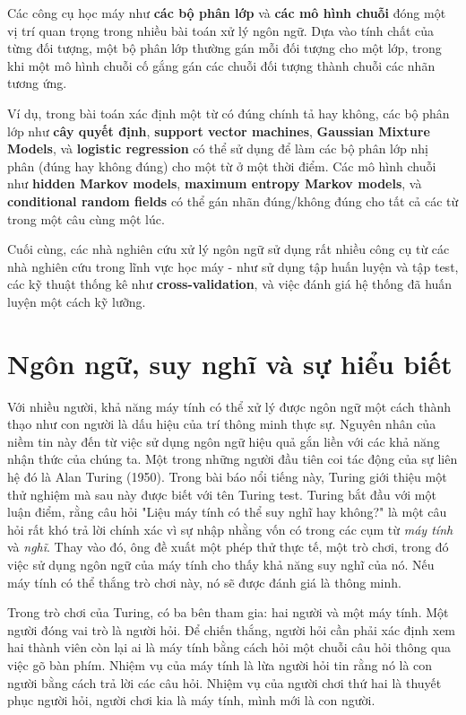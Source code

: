 Các công cụ học máy như \textbf{các bộ phân lớp} và \textbf{các mô hình chuỗi} đóng một vị trí quan trọng trong nhiều bài toán xử lý ngôn ngữ. Dựa vào tính chất của từng đối tượng, một bộ phân lớp thường gán mỗi đối tượng cho một lớp, trong khi một mô hình chuỗi cố gắng gán các chuỗi đối tượng thành chuỗi các nhãn tương ứng.

Ví dụ, trong bài toán xác định một từ có đúng chính tả hay không, các bộ phân lớp như \textbf{cây quyết định}, \textbf{support vector machines}, \textbf{Gaussian Mixture Models}, và \textbf{logistic regression} có thể sử dụng để làm các bộ phân lớp nhị phân (đúng hay không đúng) cho một từ ở một thời điểm. Các mô hình chuỗi như \textbf{hidden Markov models}, \textbf{maximum entropy Markov models}, và \textbf{conditional random fields} có thể gán nhãn đúng/không đúng cho tất cả các từ trong một câu cùng một lúc.

Cuối cùng, các nhà nghiên cứu xử lý ngôn ngữ sử dụng rất nhiều công cụ từ các nhà nghiên cứu trong lĩnh vực học máy - như sử dụng tập huấn luyện và tập test, các kỹ thuật thống kê như \textbf{cross-validation}, và việc đánh giá hệ thống đã huấn luyện một cách kỹ lưỡng.

\section{Ngôn ngữ, suy nghĩ và sự hiểu biết}

Với nhiều người, khả năng máy tính có thể xử lý được ngôn ngữ một cách thành thạo như con người là dấu hiệu của trí thông minh thực sự. Nguyên nhân của niềm tin này đến từ việc sử dụng ngôn ngữ hiệu quả gắn liền với các khả năng nhận thức của chúng ta. Một trong những người đầu tiên coi tác động của sự liên hệ đó là Alan Turing (1950). Trong bài báo nổi tiếng này, Turing giới thiệu một thử nghiệm mà sau này được biết với tên Turing test. Turing bắt đầu với một luận điểm, rằng câu hỏi "Liệu máy tính có thể suy nghĩ hay không?" là một câu hỏi rất khó trả lời chính xác vì sự nhập nhằng vốn có trong các cụm từ \textit{máy tính} và \textit{nghĩ}. Thay vào đó, ông đề xuất một phép thử thực tế, một trò chơi, trong đó việc sử dụng ngôn ngữ của máy tính cho thấy khả năng suy nghĩ của nó. Nếu máy tính có thể thắng trò chơi này, nó sẽ được đánh giá là thông minh.

Trong trò chơi của Turing, có ba bên tham gia: hai người và một máy tính. Một người đóng vai trò là người hỏi. Để chiến thắng, người hỏi cần phải xác định xem hai thành viên còn lại ai là máy tính bằng cách hỏi một chuỗi câu hỏi thông qua việc gõ bàn phím. Nhiệm vụ của máy tính là lừa người hỏi tin rằng nó là con người bằng cách trả lời các câu hỏi. Nhiệm vụ của người chơi thứ hai là thuyết phục người hỏi, người chơi kia là máy tính, mình mới là con người.

